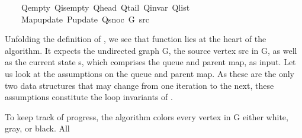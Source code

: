 \begin{isabellebody}
\ \ \ \ Q{\isacharunderscore}{\kern0pt}empty\ Q{\isacharunderscore}{\kern0pt}is{\isacharunderscore}{\kern0pt}empty\ Q{\isacharunderscore}{\kern0pt}head\ Q{\isacharunderscore}{\kern0pt}tail\ Q{\isacharunderscore}{\kern0pt}invar\ Q{\isacharunderscore}{\kern0pt}list\isanewline
\ \ \ \ Map{\isacharunderscore}{\kern0pt}update\ P{\isacharunderscore}{\kern0pt}update\ Q{\isacharunderscore}{\kern0pt}snoc\ G\ src{\isachardoublequoteclose}%
\isadelimdocument
%
\endisadelimdocument
%
\isatagdocument
%
\isamarkuptrue%
%
\endisatagdocument
{\isafolddocument}%
%
\isadelimdocument
%
\endisadelimdocument
%
\begin{isamarkuptext}%
Unfolding the definition of , we see that function  lies at the heart
of the algorithm. It expects the undirected graph G, the source vertex src in G, as well as the
current state s, which comprises the queue and parent map, as input. Let us look at the assumptions
on the queue and parent map. As these are the only two data structures that may change from one
iteration to the next, these assumptions constitute the loop invariants of .%
\end{isamarkuptext}\isamarkuptrue%
%
\begin{isamarkuptext}%
To keep track of progress, the algorithm colors every vertex in G either white, gray, or black. All

\end{isamarkuptext}
\end{isabellebody}
